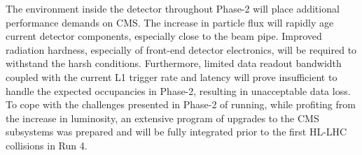 The environment inside the detector throughout Phase-2 will place additional performance demands on CMS. The increase in particle flux will rapidly age current detector components, especially close to the beam pipe. Improved radiation hardness, especially of front-end detector electronics, will be required to withstand the harsh conditions. Furthermore, limited data readout bandwidth coupled with the current L1 trigger rate and latency will prove insufficient to handle the expected occupancies in Phase-2, resulting in unacceptable data loss. To cope with the challenges presented in Phase-2 of running, while profiting from the increase in luminosity, an extensive program of upgrades to the CMS subsystems was prepared and will be fully integrated prior to the first HL-LHC collisions in Run 4.
